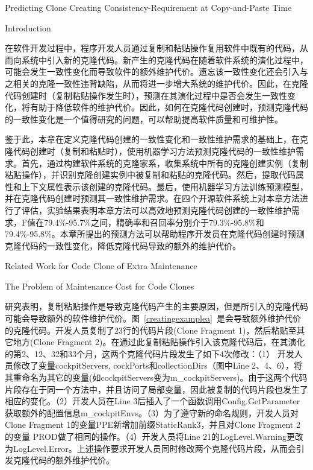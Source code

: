 
{Predicting Clone Creating Consistency-Requirement at Copy-and-Paste Time}

{Introduction}

在软件开发过程中，程序开发人员通过复制和粘贴操作复用软件中既有的代码，从而向系统中引入新的克隆代码。新产生的克隆代码在随着软件系统的演化过程中，可能会发生一致性变化而导致软件的额外维护代价。遗忘该一致性变化还会引入与之相关的克隆一致性违背缺陷，从而将进一步增大系统的维护代价。因此，在克隆代码创建时（复制粘贴操作发生时），预测在其演化过程中是否会发生一致性变化，将有助于降低软件的维护代价。因此，如何在克隆代码创建时，预测克隆代码的一致性变化是一个值得研究的问题，可以帮助提高软件质量和可维护性。

鉴于此，本章在定义克隆代码创建的一致性变化和一致性维护需求的基础上，在克隆代码创建时（复制和粘贴时），使用机器学习方法预测克隆代码的一致性维护需求。首先，通过构建软件系统的克隆家系，收集系统中所有的克隆创建实例（复制粘贴操作），并识别克隆创建实例中被复制和粘贴的克隆代码。然后，提取代码属性和上下文属性表示该创建的克隆代码。最后，使用机器学习方法训练预测模型，并在克隆代码创建时预测其一致性维护需求。在四个开源软件系统上对本章方法进行了评估，实验结果表明本章方法可以高效地预测克隆代码创建的一致性维护需求，F值在79.4\%-95.7\%之间，精确率和召回率分别介于79.3\%-95.8\%和79.4\%-95.8\%。本章所提出的预测方法可以帮助程序开发员在克隆代码创建时预测克隆代码的一致性变化，降低克隆代码导致的额外的维护代价。

{Related Work for Code Clone of Extra Maintenance}

{The Problem of Maintenance Cost for Code Clones}

研究表明，复制粘贴操作是导致克隆代码产生的主要原因，但是所引入的克隆代码可能会导致额外的软件维护代价。图~\ref{creatingexamplea}~是会导致额外维护代价的克隆代码。开发人员复制了23行的代码片段(Clone Fragment 1)，然后粘贴至其它地方(Clone Fragment 2)。在通过此复制粘贴操作引入该克隆代码后，在其演化的第2、12、32和33个月，这两个克隆代码片段发生了如下4次修改：（1） 开发人员修改了变量{cockpitServers, cockPorts}和{collectionDirs}（图中Line 2、4、6），将其重命名为其它的变量(如{cockpitServers}变为{m\_cockpitServers})。由于这两个代码片段存在于同一个方法中，并且访问了局部变量，因此被复制的代码片段也发生了相应的变化。（2）开发人员在Line 3后插入了一个函数调用{Config.GetParameter}获取额外的配置信息{m\_cockpitEnvs}。（3）为了遵守新的命名规则，开发人员对Clone Fragment 1的变量{PPE}新增加前缀{StaticRank3}，并且对Clone Fragment 2的变量{ PROD}做了相同的操作。（4）开发人员将Line 21的{LogLevel.Warning}更改为{LogLevel.Error}。上述操作要求开发人员同时修改两个克隆代码片段，从而会引发克隆代码的额外维护代价。

